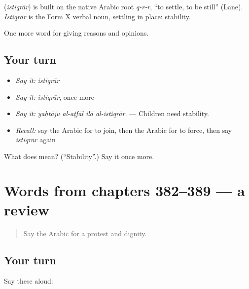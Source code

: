 \begin{cousinweb}
\textbf{} (\emph{istiqrār}) is built on the native Arabic root \emph{q-r-r}, \textquotedblleft{}to settle, to be still\textquotedblright{} (Lane). \emph{Istiqrār} is the Form X verbal noun, settling in place: stability.
\end{cousinweb}

\begin{grammarlens}[title={What you've built}]
One more word for giving reasons and opinions.
\end{grammarlens}

\subsection*{Your turn}
\begin{itemize}
\raggedright
  \item \emph{Say it:} \emph{istiqrār}
  \item \emph{Say it:} \emph{istiqrār}, once more
  \item \emph{Say it:} \emph{yaḥtāju al-aṭfāl ilā al-istiqrār.} — Children need stability.
  \item \emph{Recall:} say the Arabic for to join, then the Arabic for to force, then say \emph{istiqrār} again
\end{itemize}

\begin{tcolorbox}[breakable,colback=teal!4,colframe=teal!35!black,title={Before you move on}]
What does  mean? (\textquotedblleft{}Stability\textquotedblright{}.) Say it once more.
\end{tcolorbox}
\section[(dialogue)]{Words from chapters 382–389 — a review}

\label{lesson:AR-R389-review-382-389}



\begin{quote}
Say the Arabic for a protest and dignity.
\end{quote}

\subsection*{Your turn}
Say these aloud:

